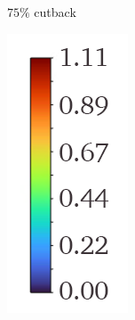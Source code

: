 \documentclass[a4paper, 11pt, oneside]{report}
\begin{document}
\begin{figure}[H]
\begin{subfigure}{.42\textwidth}
		\caption{$75\%$ cutback}
		\vspace{0.018\textheight}
	\end{subfigure}
	\begin{subfigure}{.15\textwidth}
		\centering
		\includegraphics[width=\linewidth]{figs/mach_legend_design.png}

\end{subfigure}
\end{figure}
\end{document}
